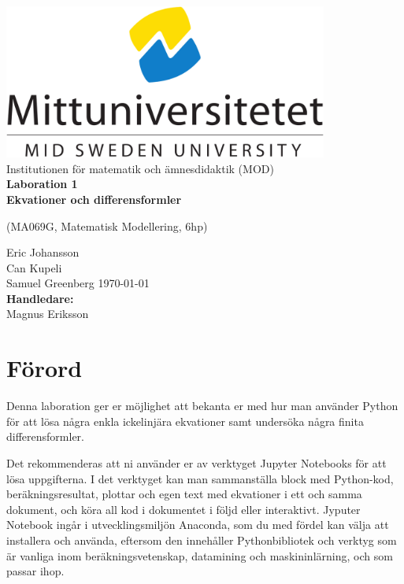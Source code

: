 \documentclass[a4paper]{article}
\newcommand{\getauthor}{Eric Johansson\\
                        Can Kupeli\\
                        Samuel Greenberg} %
\newcommand{\gettitle}{Laboration 1 \\ Ekvationer och differensformler} %
\newcommand{\getcourse}{(MA069G, Matematisk Modellering, 6hp)} %
\newcommand{\getsupervisor}{Magnus Eriksson}
\begin{document}
\begin{titlepage}
  \begin{center}
    \vspace*{1cm}
    \includegraphics[width=0.8\textwidth]{msu.png}\\[0.5cm]
    \Large
    Institutionen för matematik och ämnesdidaktik (MOD)\\[1cm]
    \Huge
    \textbf{\gettitle}

    \large
    \getcourse{}

    \vspace{1cm}
    \getauthor{}
    \vfill
    \vspace{0.8cm}
    \small
    \today \\
    \Large
    \textbf{Handledare:}\\
    \getsupervisor{}
  \end{center}
\end{titlepage}

\tableofcontents
\newpage

\section{Förord}
Denna laboration ger er möjlighet att bekanta er med hur man använder
Python för att lösa några enkla ickelinjära ekvationer samt undersöka
några finita differensformler.

Det rekommenderas att ni använder er av verktyget Jupyter Notebooks för att lösa
uppgifterna. I det verktyget kan man sammanställa block med Python-kod, beräkningsresultat,
plottar och egen text med ekvationer i ett och samma dokument, och köra all kod i dokumentet
i följd eller interaktivt. Jyputer Notebook ingår i utvecklingsmiljön Anaconda, som du med
fördel kan välja att installera och använda, eftersom den innehåller Pythonbibliotek och
verktyg som är vanliga inom beräkningsvetenskap, datamining och maskininlärning, och som passar ihop.
\end{document}
